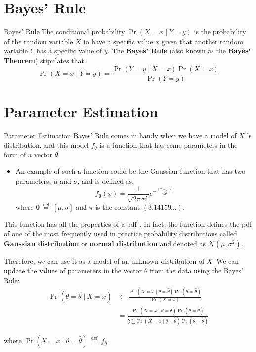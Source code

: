 \documentclass[9pt,dvipsnames]{beamer}
\begin{document}
\section{Bayes' Rule}
\begin{frame}{Bayes' Rule}
	The conditional probability $\operatorname{Pr}(X=x \mid Y=y)$ is the probability of the random variable $X$ to have a specific value $x$ given that another random variable $Y$ has a specific value of $y$. The \textbf{Bayes' Rule} (also known as the \textbf{Bayes' Theorem}) stipulates that:
	$$
	\operatorname{Pr}(X=x \mid Y=y)=\frac{\operatorname{Pr}(Y=y \mid X=x) \operatorname{Pr}(X=x)}{\operatorname{Pr}(Y=y)}
	$$
\end{frame}

\section{Parameter Estimation}
\begin{frame}{Parameter Estimation}
	Bayes' Rule comes in handy when we have a model of $X$ 's distribution, and this model $f_{\theta}$ is a function that has some parameters in the form of a vector $\theta$. 
	\begin{itemize}
		\item An example of such a function could be the Gaussian function that has two parameters, $\mu$ and $\sigma$, and is defined as:
		$$
		f_{\boldsymbol{\theta}}(x)=\frac{1}{\sqrt{2 \pi \sigma^{2}}} e^{-\frac{(x-\mu)^{2}}{2 \sigma^{2}}}
		$$
		where $\boldsymbol{\theta} \stackrel{\text { def }}{=}[\mu, \sigma]$ and $\pi$ is the constant $(3.14159 \ldots)$.
	\end{itemize}

	This function has all the properties of a $\mathrm{pdf}^{1}$. In fact, the function defines the pdf of one of the most frequently used in practice probability distributions called \textbf{Gaussian distribution} or \textbf{normal distribution} and denoted as $\mathcal{N}\left(\mu, \sigma^{2}\right)$.
\end{frame}

\begin{frame}
	Therefore, we can use it as a model of an unknown distribution of $X$. We can update the values of parameters in the vector $\theta$ from the data using the Bayes' Rule:
\begin{equation*}
	\begin{aligned}
		\operatorname{Pr}(\theta=\hat{\theta} \mid X=x) &\leftarrow \frac{\operatorname{Pr}(X=x \mid \theta=\hat{\theta}) \operatorname{Pr}(\theta=\hat{\theta})}{\operatorname{Pr}(X=x)} \\
		&= \frac{\operatorname{Pr}(X=x \mid \theta=\hat{\theta}) \operatorname{Pr}(\theta=\hat{\theta})}{\sum_{\tilde{\theta}} \operatorname{Pr}(X=x \mid \theta=\tilde{\theta}) \operatorname{Pr}(\theta=\tilde{\theta})}
	\end{aligned}
\end{equation*}

	where $\operatorname{Pr}(X=x \mid \theta=\hat{\theta}) \stackrel{\text { def }}{=} f_{\hat{\theta}}$.
\end{frame}
\end{document}
